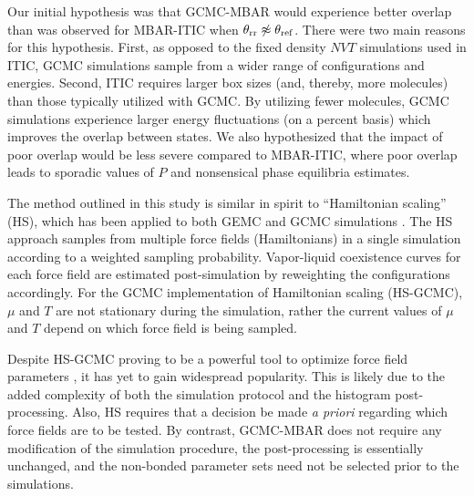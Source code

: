 \documentclass[journal=jced,manuscript=article]{achemso}
\begin{document}

Our initial hypothesis was that GCMC-MBAR would experience better overlap than was observed for MBAR-ITIC when $\theta_{\rm rr} \not\approx \theta_{\rm ref}$. There were two main reasons for this hypothesis. First, as opposed to the fixed density $NVT$ simulations used in ITIC, GCMC simulations sample from a wider range of configurations and energies. Second, ITIC requires larger box sizes (and, thereby, more molecules) than those typically utilized with GCMC. By utilizing fewer molecules, GCMC simulations experience larger energy fluctuations (on a percent basis) which improves the overlap between states. We also hypothesized that the impact of poor overlap would be less severe compared to MBAR-ITIC, where poor overlap leads to sporadic values of $P$ and nonsensical phase equilibria estimates.  



The method outlined in this study is similar in spirit to ``Hamiltonian scaling'' (HS), which has been applied to both GEMC \cite{Kiyohara1996} and GCMC simulations \cite{Errington1998,Exp6,Errington1999,Pana2000}. The HS approach samples from multiple force fields (Hamiltonians) in a single simulation according to a weighted sampling probability. Vapor-liquid coexistence curves for each force field are estimated post-simulation by reweighting the configurations accordingly. For the GCMC implementation of Hamiltonian scaling (HS-GCMC), $\mu$ and $T$ are not stationary during the simulation, rather the current values of $\mu$ and $T$ depend on which force field is being sampled. 

Despite HS-GCMC proving to be a powerful tool to optimize force field parameters \cite{Errington1998,Exp6,Errington1999,Pana2000}, it has yet to gain widespread popularity. This is likely due to the added complexity of both the simulation protocol and the histogram post-processing. Also, HS requires that a decision be made \textit{a priori} regarding which force fields are to be tested. By contrast, GCMC-MBAR does not require any modification of the simulation procedure, the post-processing is essentially unchanged, and the non-bonded parameter sets need not be selected prior to the simulations.
\end{document}
